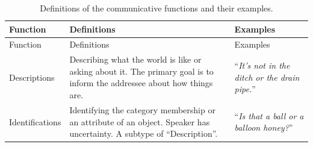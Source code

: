 \documentclass[floatsintext,man]{apa6}
\theoremstyle{definition}
\theoremstyle{definition}
\theoremstyle{definition}
\theoremstyle{remark}
\begin{document}
\begin{longtable}[]{@{}lll@{}}
\caption{\label{tab:speechActs} Definitions of the communicative functions
and their examples.}\tabularnewline
\toprule
\begin{minipage}[b]{0.14\columnwidth}\raggedright\strut
Function\strut
\end{minipage} & \begin{minipage}[b]{0.44\columnwidth}\raggedright\strut
Definitions\strut
\end{minipage} & \begin{minipage}[b]{0.33\columnwidth}\raggedright\strut
Examples\strut
\end{minipage}\tabularnewline
\midrule
\endfirsthead
\toprule
\begin{minipage}[b]{0.14\columnwidth}\raggedright\strut
Function\strut
\end{minipage} & \begin{minipage}[b]{0.44\columnwidth}\raggedright\strut
Definitions\strut
\end{minipage} & \begin{minipage}[b]{0.33\columnwidth}\raggedright\strut
Examples\strut
\end{minipage}\tabularnewline
\midrule
\endhead
\begin{minipage}[t]{0.14\columnwidth}\raggedright\strut
Descriptions\strut
\end{minipage} & \begin{minipage}[t]{0.44\columnwidth}\raggedright\strut
Describing what the world is like or asking about it. The primary goal
is to inform the addressee about how things are.\strut
\end{minipage} & \begin{minipage}[t]{0.33\columnwidth}\raggedright\strut
\enquote{\emph{It's not in the ditch or the drain pipe.}}\strut
\end{minipage}\tabularnewline
\begin{minipage}[t]{0.14\columnwidth}\raggedright\strut
Identifications\strut
\end{minipage} & \begin{minipage}[t]{0.44\columnwidth}\raggedright\strut
Identifying the category membership or an attribute of an object.
Speaker has uncertainty. A subtype of \enquote{Description}.\strut
\end{minipage} & \begin{minipage}[t]{0.33\columnwidth}\raggedright\strut
\enquote{\emph{Is that a ball or a balloon honey?}}\strut
\end{minipage}\tabularnewline

\end{longtable}
\end{document}
